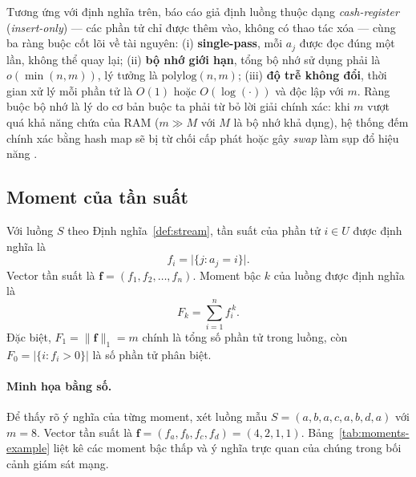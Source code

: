 Tương ứng với định nghĩa trên, báo cáo giả định luồng thuộc dạng \textit{cash-register} (\textit{insert-only}) --- các phần tử chỉ được thêm vào, không có thao tác xóa --- cùng ba ràng buộc cốt lõi về tài nguyên: (i) \textbf{single-pass}, mỗi $a_j$ được đọc đúng một lần, không thể quay lại; (ii) \textbf{bộ nhớ giới hạn}, tổng bộ nhớ sử dụng phải là $o(\min(n, m))$, lý tưởng là $\mathrm{polylog}(n, m)$; (iii) \textbf{độ trễ không đổi}, thời gian xử lý mỗi phần tử là $O(1)$ hoặc $O(\log(\cdot))$ và độc lập với $m$. Ràng buộc bộ nhớ là lý do cơ bản buộc ta phải từ bỏ lời giải chính xác: khi $m$ vượt quá khả năng chứa của RAM ($m \gg M$ với $M$ là bộ nhớ khả dụng), hệ thống đếm chính xác bằng hash map sẽ bị từ chối cấp phát hoặc gây \textit{swap} làm sụp đổ hiệu năng \cite{chakrabarti2019streams}.

\subsection{Moment của tần suất}

\begin{definition}
\label{def:freq}
Với luồng $S$ theo Định nghĩa~\ref{def:stream}, tần suất của phần tử $i \in U$ được định nghĩa là
\begin{equation}
f_i = \big|\{j : a_j = i\}\big|.
\label{eq:frequency-definition}
\end{equation}
Vector tần suất là $\mathbf{f} = (f_1, f_2, \ldots, f_n)$. Moment bậc $k$ của luồng được định nghĩa là
\begin{equation}
F_k = \sum_{i=1}^{n} f_i^{\,k}.
\label{eq:frequency-moment}
\end{equation}
Đặc biệt, $F_1 = \|\mathbf{f}\|_1 = m$ chính là tổng số phần tử trong luồng, còn $F_0 = |\{i : f_i > 0\}|$ là số phần tử phân biệt.
\end{definition}

\paragraph{Minh họa bằng số.}
Để thấy rõ ý nghĩa của từng moment, xét luồng mẫu $S = (a, b, a, c, a, b, d, a)$ với $m = 8$. Vector tần suất là $\mathbf{f} = (f_a, f_b, f_c, f_d) = (4, 2, 1, 1)$. Bảng~\ref{tab:moments-example} liệt kê các moment bậc thấp và ý nghĩa trực quan của chúng trong bối cảnh giám sát mạng.

